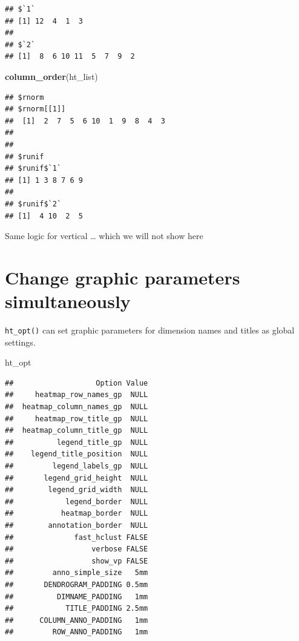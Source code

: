 \documentclass[]{book}
\newenvironment{Shaded}{\begin{snugshade}}{\end{snugshade}}
\newcommand{\KeywordTok}[1]{\textcolor[rgb]{0.13,0.29,0.53}{\textbf{#1}}}
\newcommand{\NormalTok}[1]{#1}
\theoremstyle{definition}
\theoremstyle{definition}
\theoremstyle{definition}
\theoremstyle{remark}
\begin{document}
\begin{verbatim}
## $`1`
## [1] 12  4  1  3
## 
## $`2`
## [1]  8  6 10 11  5  7  9  2
\end{verbatim}

\begin{Shaded}
\begin{Highlighting}[]
\KeywordTok{column_order}\NormalTok{(ht_list)}
\end{Highlighting}
\end{Shaded}

\begin{verbatim}
## $rnorm
## $rnorm[[1]]
##  [1]  2  7  5  6 10  1  9  8  4  3
## 
## 
## $runif
## $runif$`1`
## [1] 1 3 8 7 6 9
## 
## $runif$`2`
## [1]  4 10  2  5
\end{verbatim}

Same logic for vertical \ldots{} which we will not show here

\section{Change graphic parameters
simultaneously}\label{change-graphic-parameters-simultaneously}

\texttt{ht\_opt()} can set graphic parameters for dimension names and
titles as global settings.

\begin{Shaded}
\begin{Highlighting}[]
\NormalTok{ht_opt}
\end{Highlighting}
\end{Shaded}

\begin{verbatim}
##                   Option Value
##     heatmap_row_names_gp  NULL
##  heatmap_column_names_gp  NULL
##     heatmap_row_title_gp  NULL
##  heatmap_column_title_gp  NULL
##          legend_title_gp  NULL
##    legend_title_position  NULL
##         legend_labels_gp  NULL
##       legend_grid_height  NULL
##        legend_grid_width  NULL
##            legend_border  NULL
##           heatmap_border  NULL
##        annotation_border  NULL
##              fast_hclust FALSE
##                  verbose FALSE
##                  show_vp FALSE
##         anno_simple_size   5mm
##       DENDROGRAM_PADDING 0.5mm
##          DIMNAME_PADDING   1mm
##            TITLE_PADDING 2.5mm
##      COLUMN_ANNO_PADDING   1mm
##         ROW_ANNO_PADDING   1mm
\end{verbatim}
\end{document}
